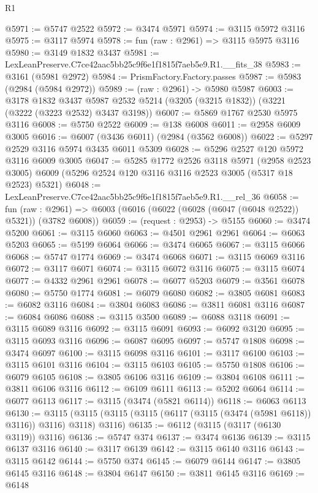 \begin{lexlean}{R1}
\begin{coremodule}
@5971 := @5747 @2522
@5972 := @3474 @5971
@5974 := @3115 @5972 @3116
@5975 := @3117 @5974
@5978 := fun (raw : @2961) => @3115 @5975 @3116
@5980 := @3149 @1832 @3437
@5981 := LexLeanPreserve.C7ce42aac5bb25c9f6e1f1815f7aeb5e9.R1.__fits_38
@5983 := @3161 (@5981 @2972)
@5984 := PrismFactory.Factory.passes
@5987 := @5983 (@2984 (@5984 @2972))
@5989 := (raw : @2961) -> @5980 @5987
@6003 := @3178
    @1832
    @3437
    @5987
    @2532
    @5214
    (@3205 (@3215 @1832))
    (@3221 (@3222 (@3223 @2532) @3437 @3198))
@6007 := @5869 @1767 @2530 @5975 @3116
@6008 := @5750 @2522
@6009 := @138 @6008
@6011 := @2958 @6009 @3005
@6016 := @6007 (@3436 @6011) (@2984 (@3562 @6008))
@6022 := @5297 @2529 @3116 @5974 @3435 @6011 @5309
@6028 := @5296 @2527 @120 @5972 @3116 @6009 @3005
@6047 := @5285
    @1772
    @2526
    @3118
    @5971
    (@2958 @2523 @3005)
    @6009
    (@5296 @2524 @120 @3116 @3116 @2523 @3005 (@5317 @18 @2523) @5321)
@6048 := LexLeanPreserve.C7ce42aac5bb25c9f6e1f1815f7aeb5e9.R1.__rel_36
@6058 := fun (raw : @2961) =>
  @6003 (@6016 (@6022 (@6028 (@6047 (@6048 @2522)) @5321)) (@3782 @6008))
@6059 := (request : @2953) -> @5155
@6060 := @3474 @5200
@6061 := @3115 @6060
@6063 := @4501 @2961 @2961
@6064 := @6063 @5203
@6065 := @5199 @6064
@6066 := @3474 @6065
@6067 := @3115 @6066
@6068 := @5747 @1774
@6069 := @3474 @6068
@6071 := @3115 @6069 @3116
@6072 := @3117 @6071
@6074 := @3115 @6072 @3116
@6075 := @3115 @6074
@6077 := @4332 @2961 @2961
@6078 := @6077 @5203
@6079 := @3561 @6078
@6080 := @5750 @1774
@6081 := @6079 @6080
@6082 := @3805 @6081
@6083 := @6082 @3116
@6084 := @3804 @6083
@6086 := @3811 @6081 @3116
@6087 := @6084 @6086
@6088 := @3115 @3500
@6089 := @6088 @3118
@6091 := @3115 @6089 @3116
@6092 := @3115 @6091
@6093 := @6092 @3120
@6095 := @3115 @6093 @3116
@6096 := @6087 @6095
@6097 := @5747 @1808
@6098 := @3474 @6097
@6100 := @3115 @6098 @3116
@6101 := @3117 @6100
@6103 := @3115 @6101 @3116
@6104 := @3115 @6103
@6105 := @5750 @1808
@6106 := @6079 @6105
@6108 := @3805 @6106 @3116
@6109 := @3804 @6108
@6111 := @3811 @6106 @3116
@6112 := @6109 @6111
@6113 := @5202 @6064
@6114 := @6077 @6113
@6117 := @3115 (@3474 (@5821 @6114))
@6118 := @6063 @6113
@6130 := @3115 (@3115 (@3115 (@3115 (@6117 (@3115 (@3474 (@5981 @6118)) @3116)) @3116) @3118) @3116)
@6135 := @6112 (@3115 (@3117 (@6130 @3119)) @3116)
@6136 := @5747 @374
@6137 := @3474 @6136
@6139 := @3115 @6137 @3116
@6140 := @3117 @6139
@6142 := @3115 @6140 @3116
@6143 := @3115 @6142
@6144 := @5750 @374
@6145 := @6079 @6144
@6147 := @3805 @6145 @3116
@6148 := @3804 @6147
@6150 := @3811 @6145 @3116
@6169 := @6148

\end{coremodule}
\end{lexlean}

